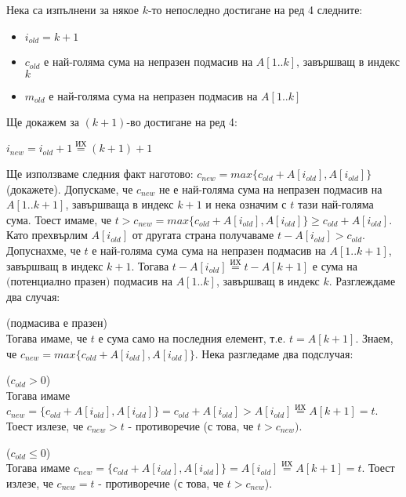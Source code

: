 \begin{maintenance}
	Нека са изпълнени за някое $k$-то непоследно достигане на ред 4 следните:
	\begin{itemize}
		\item $i_{old}=k+1$
		\item $c_{old}$ е най-голяма сума на непразен подмасив на $A[1..k]$, завършващ в индекс $k$
		\item $m_{old}$ е най-голяма сума на непразен подмасив на $A[1..k]$
	\end{itemize}
	Ще докажем за $(k+1)$-во достигане на ред 4:
	\begin{itemize}
		\item $i_{new}=i_{old}+1\overset{\text{ИХ}}=(k+1)+1$
		\item Ще използваме следния факт наготово: $c_{new}=max\{c_{old}+A[i_{old}],A[i_{old}]\}$ (докажете).
		Допускаме, че $c_{new}$ не е най-голяма сума на непразен подмасив на $A[1..k+1]$, завършваща в индекс $k+1$ и нека означим с $t$ тази най-голяма сума. Тоест имаме, че $t>c_{new}=max\{c_{old}+A[i_{old}],A[i_{old}]\}\ge c_{old}+A[i_{old}]$. Като прехвърлим $A[i_{old}]$ от другата страна получаваме $t-A[i_{old}]>c_{old}$.
		Допуснахме, че $t$ е най-голяма сума сума на непразен подмасив на $A[1..k+1]$, завършващ в индекс $k+1$. Тогава $t-A[i_{old}]\overset{\text{ИХ}}=t-A[k+1]$ е сума на $\textbf{(потенциално празен)}$ подмасив на $A[1..k]$, завършващ в индекс $k$. Разглеждаме два случая:
			

\end{mycase}
\end{itemize}
\end{maintenance}
